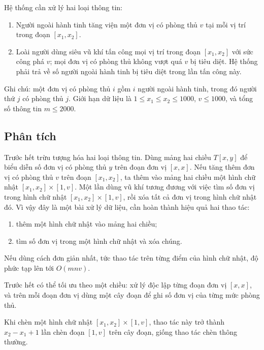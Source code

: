 \documentclass[11pt]{article}
\begin{document}
Hệ thống cần xử lý hai loại thông tin:
\begin{enumerate}
  \item Người ngoài hành tinh tăng viện một đơn vị có phòng thủ $v$ tại mỗi vị
  trí trong đoạn $[x_1,x_2]$.
  \item Loài người dùng siêu vũ khí tấn công mọi vị trí trong đoạn $[x_1,x_2]$
  với sức công phá $v$; mọi đơn vị có phòng thủ không vượt quá $v$ bị tiêu
  diệt. Hệ thống phải trả về số người ngoài hành tinh bị tiêu diệt trong lần
  tấn công này.
\end{enumerate}

Ghi chú: một đơn vị có phòng thủ $i$ gồm $i$ người ngoài hành tinh, trong đó
người thứ $j$ có phòng thủ $j$. Giới hạn dữ liệu là
$1\le x_1\le x_2\le 1000$, $v\le 1000$, và tổng số thông tin $m\le 2000$.

\subsection*{Phân tích}

Trước hết trừu tượng hóa hai loại thông tin. Dùng mảng hai chiều $T[x,y]$ để
biểu diễn số đơn vị có phòng thủ $y$ trên đoạn đơn vị $[x,x]$. Nếu tăng thêm
đơn vị có phòng thủ $v$ trên đoạn $[x_1,x_2]$, ta thêm vào mảng hai chiều một
hình chữ nhật $[x_1,x_2]\times[1,v]$. Một lần dùng vũ khí tương đương với
việc tìm số đơn vị trong hình chữ nhật $[x_1,x_2]\times[1,v]$, rồi xóa tất cả
đơn vị trong hình chữ nhật đó. Vì vậy đây là một bài xử lý dữ liệu, cần hoàn
thành hiệu quả hai thao tác:
\begin{enumerate}
  \item thêm một hình chữ nhật vào mảng hai chiều;
  \item tìm số đơn vị trong một hình chữ nhật và xóa chúng.
\end{enumerate}

Nếu dùng cách đơn giản nhất, tức thao tác trên từng điểm của hình chữ nhật,
độ phức tạp lên tới $O(mnv)$.

Trước hết có thể tối ưu theo một chiều: xử lý độc lập từng đoạn đơn vị
$[x,x]$, và trên mỗi đoạn đơn vị dùng một cây đoạn để ghi số đơn vị của từng
mức phòng thủ.

Khi chèn một hình chữ nhật $[x_1,x_2]\times[1,v]$, thao tác này trở thành
$x_2-x_1+1$ lần chèn đoạn $[1,v]$ trên cây đoạn, giống thao tác chèn thông
thường.
\end{document}
